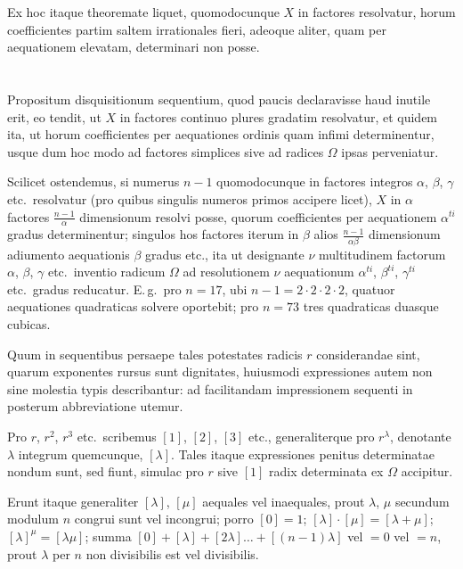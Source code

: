 \documentclass[12pt,a4paper]{article}
\theoremstyle{plain}
\theoremstyle{definition}
\theoremstyle{remark}
\begin{document}
Ex hoc itaque theoremate liquet, quomodocunque $X$ in factores resolvatur, horum coefficientes partim saltem irrationales fieri, adeoque aliter, quam per aequationem elevatam, determinari non posse.

\section{}

Propositum disquisitionum sequentium, quod paucis declaravisse haud inutile erit, eo tendit, ut $X$ in factores continuo plures gradatim resolvatur, et quidem ita, ut horum coefficientes per aequationes ordinis quam infimi determinentur, usque dum hoc modo ad factores simplices sive ad radices $\Omega$ ipsas perveniatur.

Scilicet ostendemus, si numerus $n-1$ quomodocunque in factores integros $\alpha$, $\beta$, $\gamma$ etc.\ resolvatur (pro quibus singulis numeros primos accipere licet), $X$ in $\alpha$ factores $\frac{n-1}{\alpha}$ dimensionum resolvi posse, quorum coefficientes per aequationem $\alpha^{ti}$ gradus determinentur; singulos hos factores iterum in $\beta$ alios $\frac{n-1}{\alpha\beta}$ dimensionum adiumento aequationis $\beta$ gradus etc., ita ut designante $\nu$ multitudinem factorum $\alpha$, $\beta$, $\gamma$ etc.\ inventio radicum $\Omega$ ad resolutionem $\nu$ aequationum $\alpha^{ti}$, $\beta^{ti}$, $\gamma^{ti}$ etc.\ gradus reducatur. E.\,g.\ pro $n=17$, ubi $n-1=2\cdot 2\cdot 2\cdot 2$, quatuor aequationes quadraticas solvere oportebit; pro $n=73$ tres quadraticas duasque cubicas.

Quum in sequentibus persaepe tales potestates radicis $r$ considerandae sint, quarum exponentes rursus sunt dignitates, huiusmodi expressiones autem non sine molestia typis describantur: ad facilitandam impressionem sequenti in posterum abbreviatione utemur.

Pro $r$, $r^2$, $r^3$ etc.\ scribemus $[1]$, $[2]$, $[3]$ etc., generaliterque pro $r^\lambda$, denotante $\lambda$ integrum quemcunque, $[\lambda]$. Tales itaque expressiones penitus determinatae nondum sunt, sed fiunt, simulac pro $r$ sive $[1]$ radix determinata ex $\Omega$ accipitur.

Erunt itaque generaliter $[\lambda]$, $[\mu]$ aequales vel inaequales, prout $\lambda$, $\mu$ secundum modulum $n$ congrui sunt vel incongrui; porro $[0]=1$; $[\lambda]\cdot[\mu]=[\lambda+\mu]$; $[\lambda]^\mu=[\lambda\mu]$; summa $[0]+[\lambda]+[2\lambda]\ldots+[(n-1)\lambda]$ vel $=0$ vel $=n$, prout $\lambda$ per $n$ non divisibilis est vel divisibilis.
\end{document}
